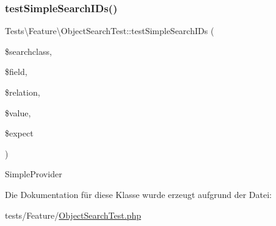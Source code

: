 \mbox{\label{classTests_1_1Feature_1_1ObjectSearchTest_a8dc4019e33415b79e5561ca7bfe600bc}} 
\subsubsection{\texorpdfstring{test\+Simple\+Search\+I\+Ds()}{testSimpleSearchIDs()}}
{\footnotesize\ttfamily Tests\textbackslash{}\+Feature\textbackslash{}\+Object\+Search\+Test\+::test\+Simple\+Search\+I\+Ds (\begin{DoxyParamCaption}\item[{}]{\$searchclass,  }\item[{}]{\$field,  }\item[{}]{\$relation,  }\item[{}]{\$value,  }\item[{}]{\$expect }\end{DoxyParamCaption})}

Simple\+Provider 

Die Dokumentation für diese Klasse wurde erzeugt aufgrund der Datei\+:\begin{DoxyCompactItemize}
\item 
tests/\+Feature/\hyperlink{ObjectSearchTest_8php}{Object\+Search\+Test.\+php}\end{DoxyCompactItemize}

